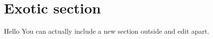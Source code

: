 \section[Outsider section]{Exotic section}

\begin{frame}{Hello}
    You can actually include a new section outside and edit apart.
\end{frame}
